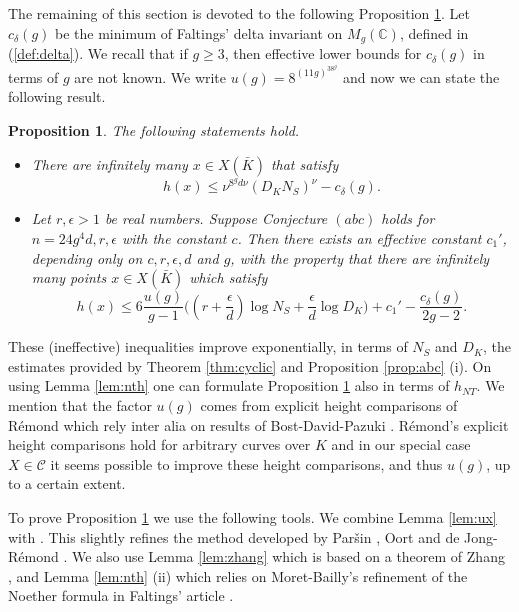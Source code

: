 \documentclass[11pt]{article}
\newtheorem{proposition}[theorem]{Proposition}
\numberwithin{equation}{section}
\newcommand {\CC}  {{\mathbb C}}
\newcommand {\p} {x}
\begin{document}
The remaining of this section is devoted to the following Proposition \ref{prop:cyclic}. Let $c_\delta(g)$ be the minimum of Faltings' delta invariant on $M_g(\CC)$, defined in (\ref{def:delta}). We recall that if $g\geq 3$, then effective lower bounds for $c_\delta(g)$ in terms of $g$ are not known. We write $u(g)=8^{(11g)^38^g}$ and now we can state the following result.

\begin{proposition}\label{prop:cyclic}
The following statements hold. 
\begin{itemize}
\item[(i)] There are infinitely many $\p\in X(\bar{K})$ that satisfy
$$h(\p)\leq \nu^{8^gd\nu}(D_KN_S)^\nu-c_\delta(g).$$
\item[(ii)] Let $r,\epsilon>1$ be real numbers. Suppose Conjecture $(abc)$ holds for $n=24g^4d,r,\epsilon$ with the constant $c$. Then there exists an effective constant $c_1'$, depending only on $c,r,\epsilon,d$ and $g$, with the property that there are infinitely many points $\p\in X(\bar{K})$ which satisfy $$h(\p)\leq 6\frac{u(g)}{g-1}\bigl((r+\frac{\epsilon}{d})\log N_S+\frac{\epsilon}{d}\log D_K\bigl)+c_1'-\frac{c_\delta(g)}{2g-2}.$$
\end{itemize}
\end{proposition}

These (ineffective) inequalities improve exponentially, in terms of $N_S$ and $D_K$, the estimates provided by Theorem \ref{thm:cyclic} and Proposition \ref{prop:abc} (i).  On using Lemma \ref{lem:nth} one can formulate Proposition \ref{prop:cyclic} also in terms of $h_{NT}$. We mention that the factor $u(g)$ comes from explicit height comparisons of R\'emond \cite{remond:rational} which rely inter alia on  results of Bost-David-Pazuki \cite{pazuki:heights}. R\'emond's explicit height comparisons hold for arbitrary curves over $K$ and in our special case $X\in\mathcal C$ it seems possible to improve these height comparisons, and thus $u(g)$, up to a certain extent.

To prove Proposition \ref{prop:cyclic} we use the following tools. 
We combine Lemma \ref{lem:ux} with \cite[Proposition 4.1 (i)]{rvk:szpiro}. 
This slightly refines the method developed by Par{\v{s}}in \cite{parshin:shafarevich}, Oort \cite{oort:shafarevich} and de Jong-R\'emond \cite{jore:shafarevich}.
We also use Lemma \ref{lem:zhang} which is based on a theorem of Zhang \cite{zhang:positive}, and Lemma \ref{lem:nth} (ii) which relies on Moret-Bailly's refinement \cite{moba:noether}  of the Noether formula in Faltings' article \cite{faltings:arithmeticsurfaces}.
\end{document}
